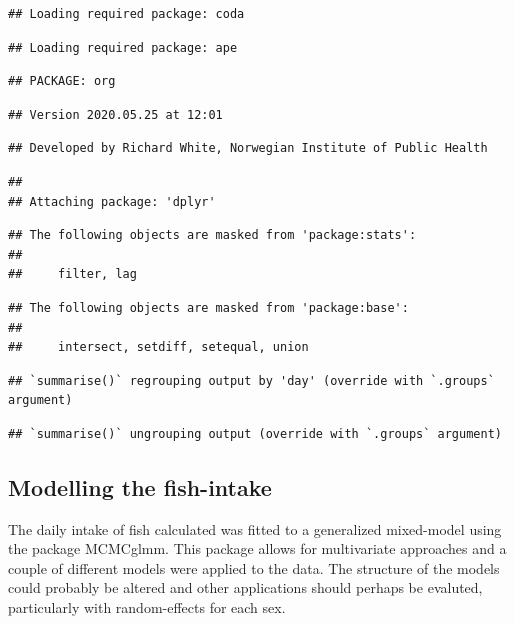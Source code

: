 \documentclass[
]{article}
\begin{document}
\begin{verbatim}
## Loading required package: coda
\end{verbatim}

\begin{verbatim}
## Loading required package: ape
\end{verbatim}

\begin{verbatim}
## PACKAGE: org
\end{verbatim}

\begin{verbatim}
## Version 2020.05.25 at 12:01
\end{verbatim}

\begin{verbatim}
## Developed by Richard White, Norwegian Institute of Public Health
\end{verbatim}

\begin{verbatim}
## 
## Attaching package: 'dplyr'
\end{verbatim}

\begin{verbatim}
## The following objects are masked from 'package:stats':
## 
##     filter, lag
\end{verbatim}

\begin{verbatim}
## The following objects are masked from 'package:base':
## 
##     intersect, setdiff, setequal, union
\end{verbatim}

\begin{verbatim}
## `summarise()` regrouping output by 'day' (override with `.groups` argument)
\end{verbatim}

\begin{verbatim}
## `summarise()` ungrouping output (override with `.groups` argument)
\end{verbatim}

\hypertarget{modelling-the-fish-intake}{%
\subsection{Modelling the fish-intake}\label{modelling-the-fish-intake}}

The daily intake of fish calculated was fitted to a generalized
mixed-model using the package MCMCglmm. This package allows for
multivariate approaches and a couple of different models were applied to
the data. The structure of the models could probably be altered and
other applications should perhaps be evaluted, particularly with
random-effects for each sex.
\end{document}
